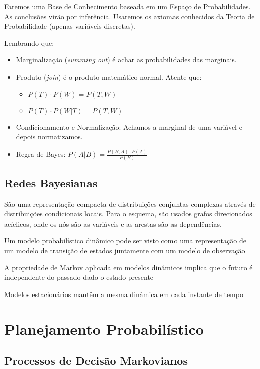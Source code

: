 \documentclass[12pt,letterpaper]{article}
\begin{document}
	Faremos uma Base de Conhecimento baseada em um Espaço de Probabilidades. As conclusões virão por inferência. Usaremos os axiomas conhecidos da Teoria de Probabilidade (apenas variáveis discretas).
	
	Lembrando que:
	
	\begin{itemize}
		\item Marginalização (\textit{summing out}) é achar as probabilidades das marginais.
		\item Produto (\textit{join}) é o produto matemático normal. Atente que:
		\begin{itemize}
			\item $P(T) \cdot P(W) = P(T, W)$
			\item $P(T) \cdot P(W|T) = P(T, W)$
		\end{itemize}
		\item Condicionamento e Normalização: Achamos a marginal de uma variável e depois normatizamos. 
		\item Regra de Bayes: $P(A|B) = \frac{P(B,A) \cdot P(A)}{P(B)}$
	\end{itemize}
	
	\subsection*{Redes Bayesianas}
	
	São uma representação compacta de distribuições conjuntas complexas através de distribuições condicionais locais. Para o esquema, são usados grafos direcionados acíclicos, onde os nós são as variáveis e as arestas são as dependências.
	
	Um modelo probabilístico dinâmico pode ser visto como uma representação de um modelo de transição de estados juntamente com um modelo de observação
	
	A propriedade de Markov aplicada em modelos dinâmicos implica que o futuro é independente do passado dado o estado presente
	
	Modelos estacionários mantêm a mesma dinâmica em cada instante de tempo	
	
	\section*{Planejamento Probabilístico}
	\subsection*{Processos de Decisão Markovianos}
	
\end{document}
